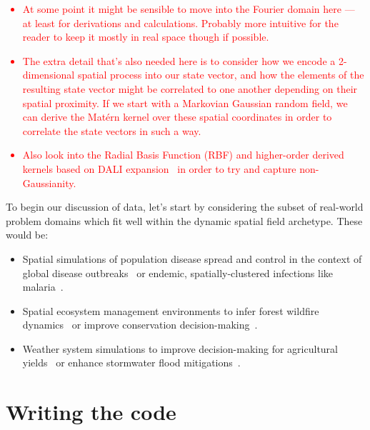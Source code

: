 \textcolor{red}{
\begin{itemize}
\item{At some point it might be sensible to move into the Fourier domain here --- at least for derivations and calculations. Probably more intuitive for the reader to keep it mostly in real space though if possible.} 
\item{The extra detail that's also needed here is to consider how we encode a 2-dimensional spatial process into our state vector, and how the elements of the resulting state vector might be correlated to one another depending on their spatial proximity. If we start with a Markovian Gaussian random field, we can derive the Mat\'{e}rn kernel over these spatial coordinates in order to correlate the state vectors in such a way.} 
\item{Also look into the Radial Basis Function (RBF) and higher-order derived kernels based on DALI expansion~\cite{sellentin2014breaking} in order to try and capture non-Gaussianity.}
\end{itemize}
}

To begin our discussion of data, let's start by considering the subset of real-world problem domains which fit well within the dynamic spatial field archetype. These would be:
\begin{itemize}
\item{Spatial simulations of population disease spread and control in the context of global disease outbreaks~\cite{ohi2020exploring} or endemic, spatially-clustered infections like malaria~\cite{carter2000spatial}.}
\item{Spatial ecosystem management environments to infer forest wildfire dynamics~\cite{ganapathi2018using} or improve conservation decision-making~\cite{lapeyrolerie2022deep}.}
\item{Weather system simulations to improve decision-making for agricultural yields~\cite{chen2021reinforcement} or enhance stormwater flood mitigations~\cite{saliba2020deep}.}
\end{itemize}

\section{\sffamily Writing the code}